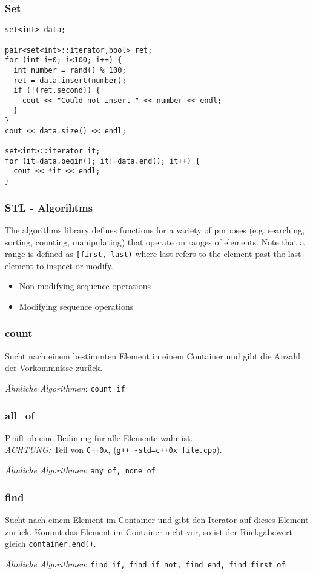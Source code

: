 \begin{frame}[fragile]
\frametitle{Set}
{\tiny
\begin{lstlisting}
set<int> data;

pair<set<int>::iterator,bool> ret;
for (int i=0; i<100; i++) {
  int number = rand() % 100;
  ret = data.insert(number);
  if (!(ret.second)) {
    cout << "Could not insert " << number << endl;
  }
}
cout << data.size() << endl;

set<int>::iterator it;
for (it=data.begin(); it!=data.end(); it++) {
  cout << *it << endl;
}
\end{lstlisting}
}
\end{frame}

\begin{frame}[fragile]
\frametitle{STL - Algorihtms}
The algorithms library defines functions for a variety of purposes (e.g. searching, sorting,
counting, manipulating) that operate on ranges of elements. Note that a range is defined as
\verb|[first, last)| where last refers to the element past the last element to inspect or modify.
\begin{itemize}
\item Non-modifying sequence operations
\item Modifying sequence operations
\end{itemize}

\end{frame}

\begin{frame}[fragile]
\frametitle{count}
{\tiny
Sucht nach einem bestimmten Element in einem
Container und gibt die Anzahl der Vorkommnisse zurück.



\emph{Ähnliche Algorithmen}: \verb|count_if|
}
\end{frame}

\begin{frame}[fragile]
\frametitle{all\_of}
{\tiny
Prüft ob eine Bedinung für alle Elemente wahr ist.\\
\emph{ACHTUNG:} Teil von \verb|C++0x|, (\verb|g++ -std=c++0x file.cpp|).



\emph{Ähnliche Algorithmen}: \verb|any_of, none_of|
}
\end{frame}

\begin{frame}[fragile]
\frametitle{find}
{\tiny
Sucht nach einem Element im Container und gibt den Iterator auf dieses Element zurück.
Kommt das Element im Container nicht vor, so ist der Rückgabewert gleich \verb|container.end()|.



\emph{Ähnliche Algorithmen}: \verb|find_if, find_if_not, find_end, find_first_of|
}
\end{frame}

